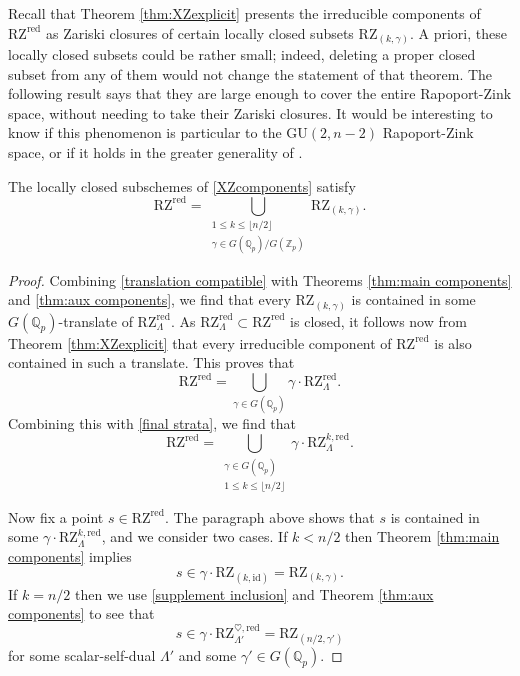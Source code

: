 \documentclass[11pt]{alggeom}
\newcommand{\red}{\mathrm{red}}
\newcommand{\Q}{\mathbb Q}
\newcommand{\Z}{\mathbb Z}
\begin{document}
Recall that Theorem \ref{thm:XZexplicit} presents the irreducible components of $\mathrm{RZ}^\red$ as Zariski closures of certain locally closed subsets  $ \mathrm{RZ}_{(k,\gamma)}$.  A priori, these locally closed subsets could be rather small; indeed, deleting a proper closed subset from any of them would not change the statement of that theorem.
The following result says that they are large enough to cover the entire Rapoport-Zink space, without needing to take their Zariski closures.  It would be interesting to know if this phenomenon is particular to the $\mathrm{GU}(2,n-2)$ Rapoport-Zink space, or if it holds in the greater generality of \cite{XZ}. 




\begin{corollary}\label{cor:component cover}
 The locally closed subschemes of \eqref{XZcomponents} satisfy
\[
\mathrm{RZ}^\red
 = \bigcup_{    \substack{   1 \le k \le \lfloor n/2\rfloor \\  \gamma  \in  G(\Q_p)/G(\Z_p) }  }  
 \mathrm{RZ}_{(k,\gamma)} .
\]
\end{corollary}

\begin{proof}
Combining  \eqref{translation compatible} with Theorems \ref{thm:main components} and \ref{thm:aux components}, we find that every $\mathrm{RZ}_{(k,\gamma)}$  is contained in some  $G(\Q_p)$-translate of $\mathrm{RZ}_\Lambda^\red$. 
As $\mathrm{RZ}_\Lambda^\red \subset \mathrm{RZ}^\red$ is closed, it follows now from Theorem \ref{thm:XZexplicit}  that every
irreducible component of $\mathrm{RZ}^\red$  is also contained in such a translate.
This proves that 
\[
\mathrm{RZ}^\red = \bigcup_{\gamma \in G(\Q_p) } \gamma \cdot \mathrm{RZ}_\Lambda^\red.
\]
Combining this with \eqref{final strata}, we find that
\[
 \mathrm{RZ}^\mathrm{red} 
 =  \bigcup_{  \substack{ \gamma \in G(\Q_p) \\ 1 \le k \le \lfloor n/2 \rfloor } }
  \gamma\cdot \mathrm{RZ}_\Lambda^{k,\mathrm{red} }.
 \]
 
Now fix a point   $s\in \mathrm{RZ}^\red$.  The paragraph above shows that $s$ is contained in some 
$\gamma \cdot \mathrm{RZ}_\Lambda^{k,\mathrm{red} }$, and we consider two cases.
If $k<n/2$ then Theorem  \ref{thm:main components} implies
\[
s \in \gamma  \cdot  \mathrm{RZ}_{ (k,\mathrm{id})} 
  =  \mathrm{RZ}_{ (k,\gamma)} .
\]
 If $k=n/2$ then we  use \eqref{supplement inclusion} and Theorem \ref{thm:aux components} to see that 
 \[
 s \in  \gamma \cdot \mathrm{RZ}_{\Lambda'}^{\heartsuit , \red}  = \mathrm{RZ}_{(n/2, \gamma')}
 \]
 for some scalar-self-dual $\Lambda'$ and some $\gamma' \in G(\Q_p)$.
\end{proof}
\end{document}
